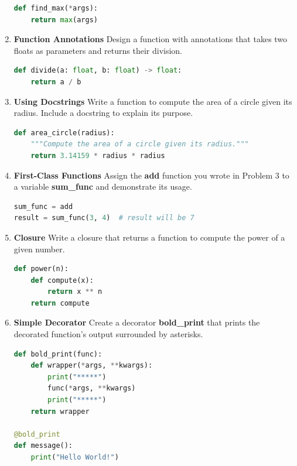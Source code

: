 \documentclass[12pt]{book}
\begin{document}
\begin{enumerate}
\begin{lstlisting}[language=Python]
def find_max(*args):
    return max(args)
\end{lstlisting}

\item \textbf{Function Annotations}
Design a function with annotations that takes two floats as parameters and returns their division.


\begin{lstlisting}[language=Python]
def divide(a: float, b: float) -> float:
    return a / b
\end{lstlisting}

\item \textbf{Using Docstrings}
Write a function to compute the area of a circle given its radius. Include a docstring to explain its purpose.


\begin{lstlisting}[language=Python]
def area_circle(radius):
    """Compute the area of a circle given its radius."""
    return 3.14159 * radius * radius
\end{lstlisting}

\item \textbf{First-Class Functions}
Assign the \textbf{add} function you wrote in Problem 3 to a variable \textbf{sum\_func} and demonstrate its usage.


\begin{lstlisting}[language=Python]
sum_func = add
result = sum_func(3, 4)  # result will be 7
\end{lstlisting}

\item \textbf{Closure}
Write a closure that returns a function to compute the power of a given number.


\begin{lstlisting}[language=Python]
def power(n):
    def compute(x):
        return x ** n
    return compute
\end{lstlisting}

\item \textbf{Simple Decorator}
Create a decorator \textbf{bold\_print} that prints the decorated function's output surrounded by asterisks.


\begin{lstlisting}[language=Python]
def bold_print(func):
    def wrapper(*args, **kwargs):
        print("*****")
        func(*args, **kwargs)
        print("*****")
    return wrapper

@bold_print
def message():
    print("Hello World!")
\end{lstlisting}


\end{enumerate}
\end{document}

